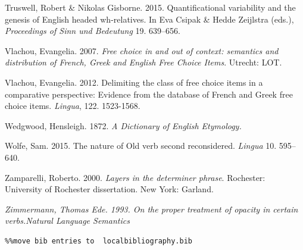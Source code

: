 \documentclass[output=paper]{langscibook}
\begin{document}
Truswell, Robert \& Nikolas Gisborne. 2015. Quantificational variability and the genesis of English headed wh-relatives. In Eva Csipak \& Hedde Zeijlstra (eds.), \textit{Proceedings of Sinn und Bedeutung} 19. 639–656.

Vlachou, Evangelia. 2007. \textit{Free choice in and out of context: semantics and distribution of French, Greek and English Free Choice Items}. Utrecht: LOT. 

Vlachou, Evangelia. 2012. Delimiting the class of free choice items in a comparative perspective: Evidence from the database of French and Greek free choice items. \textit{Lingua}, 122. 1523-1568.

Wedgwood, Hensleigh. 1872. \emph{\textmd{\textit{A Dictionary of English Etymology}}\textmd{.} } 

\begin{styleannotationtext}
Wolfe, Sam. 2015. The nature of Old  verb second reconsidered. \textit{Lingua} 10. 595–640.
\end{styleannotationtext}

Zamparelli, Roberto. 2000. \textit{Layers in the determiner phrase}. Rochester: University of Rochester dissertation. New York: Garland.

\emph{\textmd{Zimmermann, Thomas Ede. 1993. On the proper treatment of opacity in certain verbs.}}\textstyleacopre{ }\emph{\textmd{\textit{Natural Language Semantics}}}


\begin{verbatim}%%move bib entries to  localbibliography.bib
\end{verbatim}
\sloppy\printbibliography[heading=subbibliography,notkeyword=this]
\end{document}
